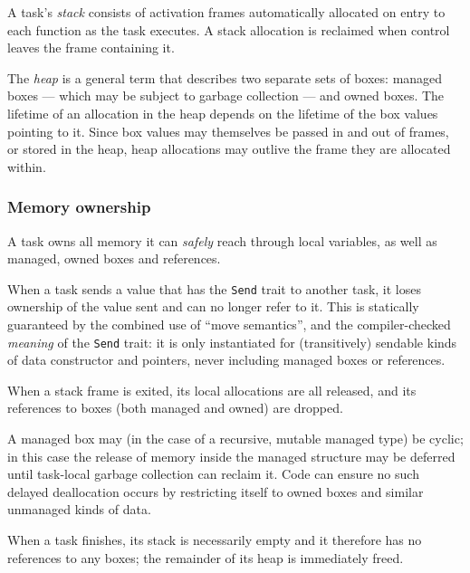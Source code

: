 \documentclass[]{article}
\begin{document}
A task's \emph{stack} consists of activation frames automatically
allocated on entry to each function as the task executes. A stack
allocation is reclaimed when control leaves the frame containing it.

The \emph{heap} is a general term that describes two separate sets of
boxes: managed boxes --- which may be subject to garbage collection ---
and owned boxes. The lifetime of an allocation in the heap depends on
the lifetime of the box values pointing to it. Since box values may
themselves be passed in and out of frames, or stored in the heap, heap
allocations may outlive the frame they are allocated within.

\subsubsection{Memory ownership}\label{memory-ownership}

A task owns all memory it can \emph{safely} reach through local
variables, as well as managed, owned boxes and references.

When a task sends a value that has the \texttt{Send} trait to another
task, it loses ownership of the value sent and can no longer refer to
it. This is statically guaranteed by the combined use of ``move
semantics'', and the compiler-checked \emph{meaning} of the
\texttt{Send} trait: it is only instantiated for (transitively) sendable
kinds of data constructor and pointers, never including managed boxes or
references.

When a stack frame is exited, its local allocations are all released,
and its references to boxes (both managed and owned) are dropped.

A managed box may (in the case of a recursive, mutable managed type) be
cyclic; in this case the release of memory inside the managed structure
may be deferred until task-local garbage collection can reclaim it. Code
can ensure no such delayed deallocation occurs by restricting itself to
owned boxes and similar unmanaged kinds of data.

When a task finishes, its stack is necessarily empty and it therefore
has no references to any boxes; the remainder of its heap is immediately
freed.

\end{document}

